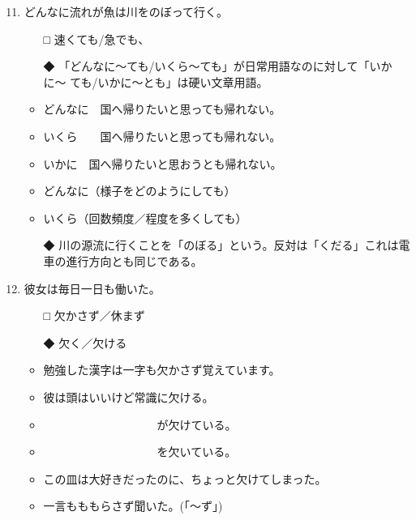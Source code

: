 \documentclass[
uplatex,
b5paper,
10pt,
dvipdfmx
]{jsbook}
\begin{document}
\begin{enumerate}
\setcounter{enumi}{10}
\item どんなに流れが\underline{\hspace{3zw}}魚は川をのぼって行く。

\begin{itemize}
\item[□] 速くても/急でも、
\item[◆] 「どんなに〜ても/いくら〜ても」が日常用語なのに対して「いかに〜
	  ても/いかに〜とも」は硬い文章用語。
\end{itemize}

\begin{itemize}
\item どんなに　国へ帰りたいと思っても帰れない。
\item いくら　　国へ帰りたいと思っても帰れない。
\item いかに　国へ帰りたいと思おうとも帰れない。
\item どんなに（様子をどのようにしても）
\item いくら（回数頻度／程度を多くしても）
\end{itemize}

\begin{itemize}
\item[◆] 川の源流に行くことを「のぼる」という。反対は「くだる」これは電
	  車の進行方向とも同じである。
\end{itemize}

\item 彼女は毎日一日も\underline{\hspace{3zw}}働いた。

\begin{itemize}
\item[□] 欠かさず／休まず
\item[◆] 欠く／欠ける
\end{itemize}

\begin{itemize}
\item 勉強した漢字は一字も欠かさず覚えています。 
\item 彼は頭はいいけど常識に欠ける。
\item 　　　　　　　　　　が欠けている。
\item 　　　　　　　　　　を欠いている。
\item この皿は大好きだったのに、ちょ{}っと欠けてしまった。
\item 一言もももらさず聞いた。(「〜ず」)
\end{itemize}


\end{enumerate}
\end{document}
